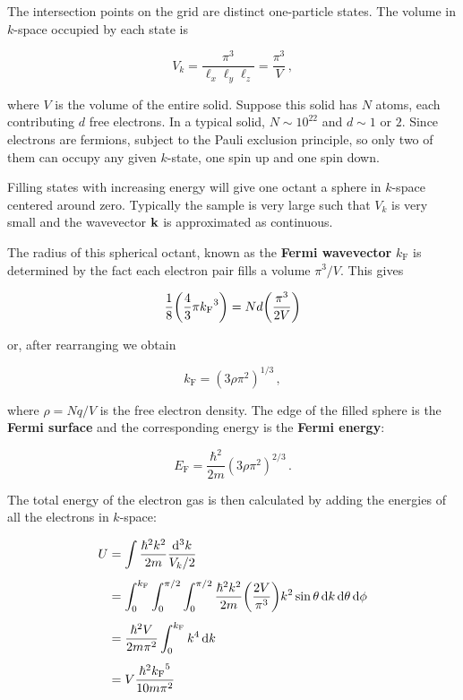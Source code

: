\documentclass[12pt, titlepage]{article}
\begin{document}

The intersection points on the grid are distinct one-particle states. The volume in $k$-space occupied by each state is 

\begin{equation}
	V_{k} = \frac{\pi^3}{\ell_x\ell_y\ell_z} = \frac{\pi^3}{V} \,,
\end{equation}

where $V$ is the volume of the entire solid. Suppose this solid has $N$ atoms, each contributing $d$ free electrons. In a typical solid, $N\sim 10^{22}$ and $d\sim 1$ or $2$. Since electrons are fermions, subject to the Pauli exclusion principle, so only two of them can occupy any given $k$-state, one spin up and one spin down.

Filling states with increasing energy will give one octant a sphere in $k$-space centered around zero. Typically the sample is very large such that $V_k$ is very small and the wavevector $\vb{k}$ is approximated as continuous.

The radius of this spherical octant, known as the \textbf{Fermi wavevector} $k_\text{F}$ is determined by the fact each electron pair fills a volume $\pi^3/V$. This gives

\begin{equation*}
	\frac{1}{8}\qty(\frac{4}{3}\pi {k_\text{F}}^3) = Nd\qty(\frac{\pi^3}{2V})
\end{equation*}

or, after rearranging we obtain

\begin{equation}
	k_\text{F} = (3\rho\pi^2)^{1/3} \,,
\end{equation}

where $\rho = Nq/V$ is the free electron density. The edge of the filled sphere is the \textbf{Fermi surface} and the corresponding energy is the \textbf{Fermi energy}:

\begin{equation}
	E_\text{F} = \frac{\hbar^2}{2m}(3\rho\pi^2)^{2/3} \,.
\end{equation}

The total energy of the electron gas is then calculated by adding the energies of all the electrons in $k$-space:

\begin{align*}
	U &= \int\frac{\hbar^2k^2}{2m}\frac{\dd[3]{k}}{V_k/2} \\[4pt]
	&= \int_{0}^{k_\text{F}}\int_{0}^{\pi/2}\int_{0}^{\pi/2}\frac{\hbar^2 k^2}{2m}\qty(\frac{2V}{\pi^3})k^2\sin\theta\dd{k}\dd{\theta}\dd{\phi} \\[4pt]
	&= \frac{\hbar^2V}{2m\pi^2}\int_{0}^{k_\text{F}}k^4\dd{k} \\[4pt]
	&= V\frac{\hbar^2{k_\text{F}}^5}{10m\pi^2}
\end{align*}
\end{document}
